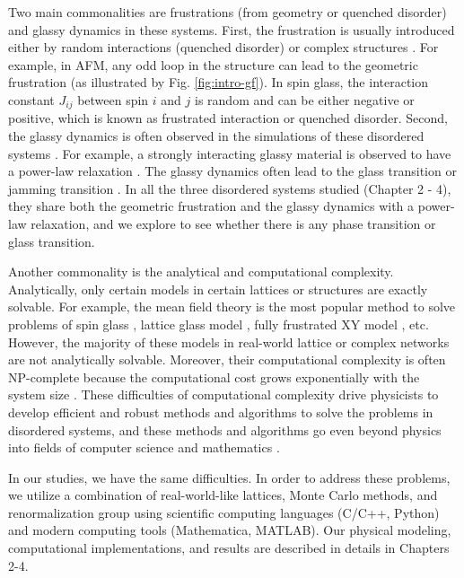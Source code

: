 Two main commonalities are frustrations (from geometry or quenched disorder) and glassy dynamics  in these systems. First, the frustration is usually introduced either by  random interactions (quenched disorder) or complex structures \cite{vannimenus1977}. For example, in AFM, any odd loop in the structure can lead to the geometric frustration \cite{wannier1950afm} (as illustrated by Fig. \ref{fig:intro-gf}). In spin glass, the interaction constant $J_{ij}$ between spin $i$ and $j$ is random and can be either negative or positive, which is known as frustrated interaction \cite{edwards1975theory} or quenched disorder.
Second, the glassy dynamics is often observed in the simulations of these disordered systems \cite{lunkenheimer2000}. For example, a strongly interacting glassy material is observed to have a power-law relaxation \cite{palmer1984}. The glassy dynamics often lead to the glass transition \cite{biroli2013perspective} or jamming transition \cite{Liu1998}. 
In all the three disordered systems studied (Chapter 2 - 4), they share both the geometric frustration and the glassy dynamics with a power-law relaxation, and we explore to see whether there is any phase transition or glass transition.

Another commonality is the analytical and computational complexity. Analytically, only certain models in certain lattices or structures are exactly solvable. For example, the mean field theory  \cite{kadanoff2009} is the most popular method to solve problems of spin glass \cite{sherrington1975}, lattice glass model \cite{Biroli02}, fully frustrated XY model \cite{kim2001xy}, etc. However, the majority of these models in real-world lattice or complex networks are not analytically solvable. Moreover, their computational complexity is often NP-complete \cite{garey1983} because the computational cost grows exponentially with the system size \cite{barahona1982, weigt2000}. These difficulties of computational complexity drive physicists to develop efficient and robust methods and algorithms to solve the problems in disordered systems, and these methods and algorithms go even beyond physics into fields of computer science and mathematics \cite{mezard1990spin, stein2013spin}.

In our studies, we have the same difficulties. In order to address these problems, we utilize a combination \cite{cheng2015jamming, ma2016prb} of real-world-like lattices, Monte Carlo methods, and renormalization group using scientific computing languages (C/C++, Python) and modern computing tools (Mathematica, MATLAB). Our physical modeling, computational implementations, and results are described in details in Chapters 2-4.



